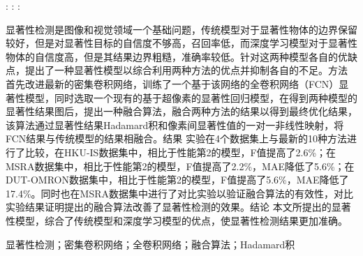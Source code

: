 \documentclass[]{my}
\begin{document}
    :  :   :

    \begin{center}
    \end{center}

    \begin{cabstract}
        显著性检测是图像和视觉领域一个基础问题，传统模型对于显著性物体的边界保留较好，但是对显著性目标的自信度不够高，召回率低，而深度学习模型对于显著性物体的自信度高，但是其结果边界粗糙，准确率较低。针对这两种模型各自的优缺点，提出了一种显著性模型以综合利用两种方法的优点并抑制各自的不足。方法 首先改进最新的密集卷积网络，训练了一个基于该网络的全卷积网络（FCN）显著性模型，同时选取一个现有的基于超像素的显著性回归模型，在得到两种模型的显著性结果图后，提出一种融合算法，融合两种方法的结果以得到最终优化结果，该算法通过显著性结果Hadamard积和像素间显著性值的一对一非线性映射，将FCN结果与传统模型的结果相融合。结果 实验在4个数据集上与最新的10种方法进行了比较，在HKU-IS数据集中，相比于性能第2的模型，F值提高了2.6\%；在MSRA数据集中，相比于性能第2的模型，F值提高了2.2\%，MAE降低了5.6\%；在DUT-OMRON数据集中，相比于性能第2的模型，F值提高了5.6\%，MAE降低了17.4\%。同时也在MSRA数据集中进行了对比实验以验证融合算法的有效性，对比实验结果证明提出的融合算法改善了显著性检测的效果。结论 本文所提出的显著性模型，综合了传统模型和深度学习模型的优点，使显著性检测结果更加准确。
    \end{cabstract}


    \begin{ckeywords}
        显著性检测；密集卷积网络；全卷积网络；融合算法；Hadamard积
    \end{ckeywords}   
    
    
\end{document}
